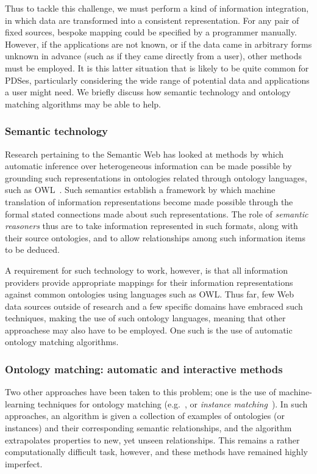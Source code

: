 \documentclass[graybox]{svmult}
\begin{document}
Thus to tackle this challenge, we must perform a kind of information integration, in which data are transformed into a consistent representation.  For any pair of fixed sources, bespoke mapping could be specified by a programmer manually.  However, if the applications are not known, or if the data came in arbitrary forms unknown in advance (such as if they came directly from a user), other methods must be employed.  It is this latter situation that is likely to be quite common for PDSes, particularly considering the wide range of potential data and applications a user might need.  We briefly discuss how semantic technology and ontology matching algorithms may be able to help.

\subsubsection{Semantic technology}

Research pertaining to the Semantic Web\emph{} has looked at methods by which automatic inference over heterogeneous information can be made possible by grounding such representations in ontologies related through ontology languages, such as OWL~\cite{antoniou2004web}.  Such semantics establish a framework by which machine translation of information representations become made possible through the formal stated connections made about such representations.  The role of \emph{semantic reasoners} thus are to take information represented in such formats, along with their source ontologies, and to allow relationships among such information items to be deduced. 

A requirement for such technology to work, however, is that all information providers provide appropriate mappings for their information representations against common ontologies using languages such as OWL.  Thus far, few Web data sources outside of research and a few specific domains have embraced such techniques, making the use of such ontology languages, meaning that other approachese may also have to be employed. One such is the use of automatic ontology matching algorithms.

\subsubsection{Ontology matching: automatic and interactive methods}
Two other approaches have been taken to this problem; one is the use of machine-learning techniques for ontology matching (e.g.~\cite{euzenat2004api,doan2003learning}, or \emph{instance matching}~\cite{suchanek2011paris,castano2006matching}).  In such approaches, an algorithm is given a collection of examples of ontologies (or instances) and their corresponding semantic relationships, and the algorithm extrapolates properties to new, yet unseen relationships.  This remains a rather computationally difficult task, however, and these methods have remained highly imperfect.
\end{document}

